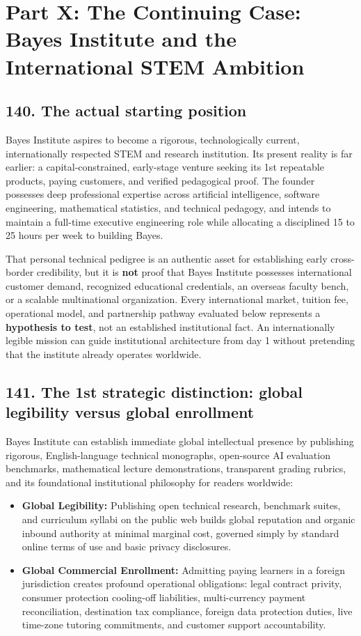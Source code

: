 \section{Part X: The Continuing Case: Bayes Institute and the International STEM Ambition}

\subsection{140. The actual starting position}

Bayes Institute aspires to become a rigorous, technologically current, internationally respected STEM and research institution. Its present reality is far earlier: a capital-constrained, early-stage venture seeking its 1st repeatable products, paying customers, and verified pedagogical proof. The founder possesses deep professional expertise across artificial intelligence, software engineering, mathematical statistics, and technical pedagogy, and intends to maintain a full-time executive engineering role while allocating a disciplined 15 to 25 hours per week to building Bayes.

That personal technical pedigree is an authentic asset for establishing early cross-border credibility, but it is \textbf{not} proof that Bayes Institute possesses international customer demand, recognized educational credentials, an overseas faculty bench, or a scalable multinational organization. Every international market, tuition fee, operational model, and partnership pathway evaluated below represents a \textbf{hypothesis to test}, not an established institutional fact. An internationally legible mission can guide institutional architecture from day 1 without pretending that the institute already operates worldwide.

\subsection{141. The 1st strategic distinction: global legibility versus global enrollment}

Bayes Institute can establish immediate global intellectual presence by publishing rigorous, English-language technical monographs, open-source AI evaluation benchmarks, mathematical lecture demonstrations, transparent grading rubrics, and its foundational institutional philosophy for readers worldwide:
\begin{itemize}
    \item \textbf{Global Legibility:} Publishing open technical research, benchmark suites, and curriculum syllabi on the public web builds global reputation and organic inbound authority at minimal marginal cost, governed simply by standard online terms of use and basic privacy disclosures.
    \item \textbf{Global Commercial Enrollment:} Admitting paying learners in a foreign jurisdiction creates profound operational obligations: legal contract privity, consumer protection cooling-off liabilities, multi-currency payment reconciliation, destination tax compliance, foreign data protection duties, live time-zone tutoring commitments, and customer support accountability.
\end{itemize}

